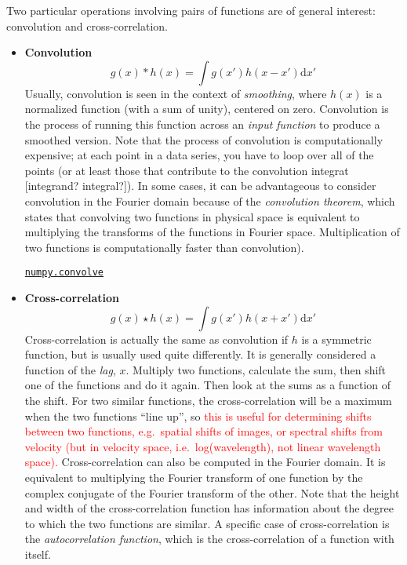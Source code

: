 \documentclass{article}
\begin{document}
Two particular operations involving pairs of functions are of general
interest: convolution and cross-correlation.

\begin{itemize}[itemsep=1ex]
    \item {\bf Convolution}$$ g(x)*h(x) = \int\!g(x')h(x-x')\mathrm{d}x'$$
        Usually, convolution is seen in the context of
        \emph{smoothing}, where $h(x)$ is a normalized function (with a sum
        of unity), centered on zero. Convolution is the process of running
        this function across an \emph{input function} to produce a smoothed
        version. Note that the process of convolution is computationally
        expensive; at each point in a data series, you have to loop over
        all of the points (or at least those that contribute to the
        convolution integrat [integrand? integral?]).
        In some cases, it can be advantageous to consider convolution in
        the Fourier domain because of the \emph{convolution
        theorem}, which states that convolving two functions in physical
        space is equivalent to multiplying the transforms of the functions
        in Fourier space. Multiplication of two functions is
        computationally faster than convolution).

        \href{http://docs.scipy.org/doc/numpy/reference/generated/numpy.convolve.html}
        {\tt numpy.convolve}

    \item {\bf Cross-correlation}
        $$ g(x)\star h(x)=\int\! g(x')h(x+x')\mathrm{d}x'$$
        Cross-correlation is actually the same as convolution if $h$
        is a symmetric function, but is usually used quite differently.
        It is generally considered a function of the \emph{lag}, $x$.
        Multiply two functions, calculate the sum, then shift one of the
        functions and do it again. Then look at the sums as a function of
        the shift.
        For two similar functions, the cross-correlation will be a maximum
        when the two functions ``line up'', so
        \textcolor{red}{this is useful for
        determining shifts between two functions, e.g.\ spatial shifts of
        images, or spectral shifts from velocity (but in velocity space,
        i.e.\ log(wavelength), not linear wavelength space).}
        Cross-correlation can also be computed in the Fourier domain. It is
        equivalent to multiplying the Fourier transform of one function by
        the complex conjugate of the Fourier transform of the other. Note
        that the height and width of the cross-correlation function has
        information about the degree to which the two functions are
        similar. A specific case of cross-correlation is the
        \emph{autocorrelation function}, which is the cross-correlation of
        a function with itself.
\end{itemize}
\end{document}
